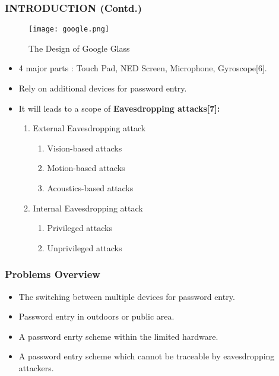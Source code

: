 \documentclass{beamer}
\begin{document}
\begin{frame}
\frametitle{INTRODUCTION (Contd.)}
\begin{figure}
    \begin{center}
        \texttt{[image: google.png]}
        \caption{The Design of Google Glass}
    \end{center}
\end{figure}
\begin{itemize}

\justifying

\item 4 major parts : Touch Pad, NED Screen, Microphone, Gyroscope[6].
\item Rely on additional devices for password entry.
\item It will leads to a scope of \textbf{Eavesdropping attacks[7]:} 
\begin{enumerate}
\item External Eavesdropping attack
\begin{enumerate}
\item Vision-based attacks
\item Motion-based attacks
\item Acoustics-based attacks
\end{enumerate}
\item Internal Eavesdropping attack
\begin{enumerate}
\item Privileged attacks
\item Unprivileged attacks
\end{enumerate}
\end{enumerate}

\end{itemize}
\end{frame}

\begin{frame}
\frametitle{ Problems Overview }
\begin{itemize}
\item The switching between multiple devices for password entry.
\item Password entry in outdoors or public area.
\item A password enrty scheme within the limited hardware.
\item A password entry scheme which cannot be traceable by eavesdropping attackers.
\end{itemize}
\end{frame}
\end{document}
